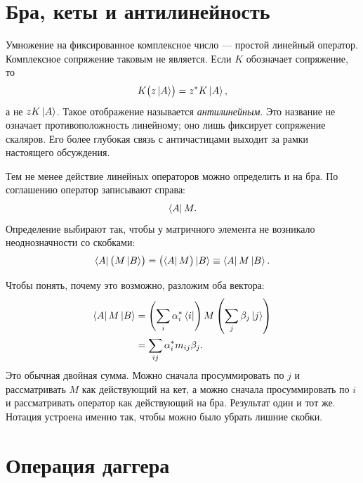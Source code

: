 \section{Бра, кеты и антилинейность}

\begin{classroomqa}
\end{classroomqa}

Умножение на фиксированное комплексное число — простой линейный оператор. Комплексное сопряжение таковым не является. Если \(K\) обозначает сопряжение, то
\[
K\bigl(z\left\lvert A\right\rangle\bigr)=z^*K\left\lvert A\right\rangle,
\]
а не \(zK\left\lvert A\right\rangle\). Такое отображение называется \emph{антилинейным}. Это название не означает противоположность линейному; оно лишь фиксирует сопряжение скаляров. Его более глубокая связь с античастицами выходит за рамки настоящего обсуждения.

Тем не менее действие линейных операторов можно определить и на бра. По соглашению оператор записывают справа:
\begin{equation}
\left\langle A\right\rvert M.
\end{equation}
Определение выбирают так, чтобы у матричного элемента не возникало неоднозначности со скобками:
\begin{equation}
\left\langle A\right\rvert\bigl(M\left\lvert B\right\rangle\bigr)
=
\bigl(\left\langle A\right\rvert M\bigr)\left\lvert B\right\rangle
\equiv
\left\langle A\right\rvert M\left\lvert B\right\rangle.
\label{eq:bracket-independence}
\end{equation}

Чтобы понять, почему это возможно, разложим оба вектора:
\begin{align}
\left\langle A\right\rvert M\left\lvert B\right\rangle
 &=\left(\sum_i\alpha_i^*\left\langle i\right\rvert\right)
   M
   \left(\sum_j\beta_j\left\lvert j\right\rangle\right)\\
 &=\sum_{ij}\alpha_i^*m_{ij}\beta_j.
\label{eq:matrix-element-double-sum}
\end{align}
Это обычная двойная сумма. Можно сначала просуммировать по \(j\) и рассматривать \(M\) как действующий на кет, а можно сначала просуммировать по \(i\) и рассматривать оператор как действующий на бра. Результат один и тот же. Нотация устроена именно так, чтобы можно было убрать лишние скобки.

\section{Операция даггера}


